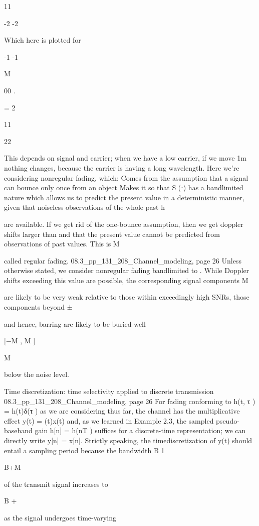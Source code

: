 {{{{11

-2
-2

Which here is plotted for \nu

-1
-1

M

00
.

= 2

11

22

This depends on signal and carrier; when we have a low carrier, if we move 1m nothing changes, because the carrier is having a long wavelength.
Here we're considering nonregular fading, which:
Comes from the assumption that a signal can bounce only once from an object Makes it so that S (⋅) has a bandlimited nature which allows us to predict the present value in a deterministic manner, given that noiseless observations of the whole past h

are available.
If we get rid of the one-bounce assumption, then we get doppler shifts larger than \nu and that the present value cannot be predicted from observations of past values. This is M

called regular fading.
08.3_pp_131_208_Channel_modeling, page 26 Unless otherwise stated, we consider nonregular fading bandlimited to \nu . While Doppler shifts exceeding this value are possible, the corresponding signal components M

are likely to be very weak relative to those within exceedingly high SNRs, those components beyond ±\nu

and hence, barring are likely to be buried well

[−\nu M , \nu M ]

M

below the noise level.

Time discretization: time selectivity applied to discrete transmission 08.3_pp_131_208_Channel_modeling, page 26 For fading conforming to h(t, τ ) = h(t)δ(τ ) as we are considering thus far, the channel has the multiplicative effect y(t) = \sqrtGh(t)x(t) and, as we learned in Example 2.3, the sampled pseudo-baseband gain h[n] = h(nT )
suffices for a discrete-time representation; we can directly write y[n] = \sqrtGh[n]x[n]. Strictly speaking, the timediscretization of y(t) should entail a sampling period because the bandwidth B 1

B+\nu M

of the transmit signal increases to

B + \nuM

as the signal undergoes time-varying

}}}}
